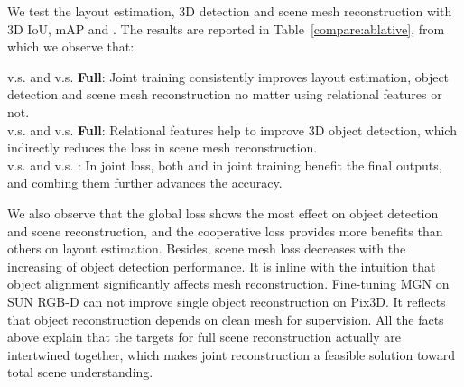 \documentclass[10pt,twocolumn,letterpaper]{article}
\begin{document}
We test the layout estimation, 3D detection and scene mesh reconstruction with 3D IoU, mAP and . The results are reported in Table~\ref{compare:ablative}, from which we observe that:

\noindent v.s. and  v.s. \textbf{Full}: Joint training consistently improves layout estimation, object detection and scene mesh reconstruction no matter using relational features or not.\\
 v.s. and  v.s. \textbf{Full}: Relational features help to improve 3D object detection, which indirectly reduces the loss in scene mesh reconstruction.\\
 v.s. and  v.s. : In joint loss, both  and  in joint training benefit the final outputs, and combing them further advances the accuracy.

We also observe that the global loss  shows the most effect on object detection and scene reconstruction, and the cooperative loss  provides more benefits than others on layout estimation. Besides, scene mesh loss decreases with the increasing of object detection performance. It is inline with the intuition that object alignment significantly affects mesh reconstruction. Fine-tuning MGN on SUN RGB-D can not improve single object reconstruction on Pix3D. It reflects that object reconstruction depends on clean mesh for supervision. All the facts above explain that the targets for full scene reconstruction actually are intertwined together, which makes joint reconstruction a feasible solution toward total scene understanding.

\begin{table}[!h]
	\begin{center}
	\end{center}
	\caption{Ablation analysis in layout estimation, 3d object detection and scene mesh reconstruction on SUN RGB-D. The  values are in units of .}
	\label{compare:ablative}
\end{table}
\end{document}
